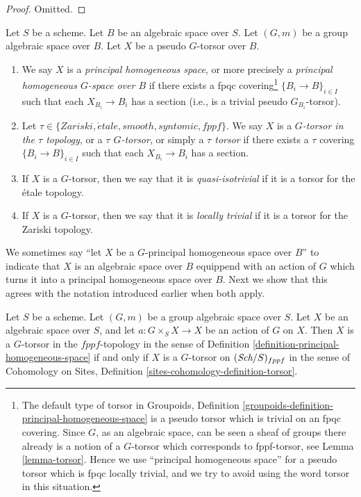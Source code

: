 \begin{proof}
Omitted.
\end{proof}

\begin{definition}
\label{definition-principal-homogeneous-space}
Let $S$ be a scheme.
Let $B$ be an algebraic space over $S$.
Let $(G, m)$ be a group algebraic space over $B$.
Let $X$ be a pseudo $G$-torsor over $B$.
\begin{enumerate}
\item We say $X$ is a
{\it principal homogeneous space}, or more precisely a
{\it principal homogeneous $G$-space over $B$}
if there exists a fpqc covering\footnote{The default type of torsor in
Groupoids, Definition \ref{groupoids-definition-principal-homogeneous-space}
is a pseudo torsor which is trivial on an fpqc covering.
Since $G$, as an algebraic space, can be seen a sheaf of groups
there already is a notion of a $G$-torsor which corresponds
to fppf-torsor, see
Lemma \ref{lemma-torsor}.
Hence we use ``principal homogeneous space'' for a pseudo torsor which
is fpqc locally trivial, and we try to avoid using the word torsor in
this situation.}
$\{B_i \to B\}_{i \in I}$ such that each
$X_{B_i} \to B_i$ has a section (i.e., is a trivial pseudo $G_{B_i}$-torsor).
\item Let $\tau \in \{Zariski, \acute{e}tale, smooth, syntomic, fppf\}$.
We say $X$ is a {\it $G$-torsor in the $\tau$ topology}, or a
{\it $\tau$ $G$-torsor}, or simply a {\it $\tau$ torsor}
if there exists a $\tau$ covering $\{B_i \to B\}_{i \in I}$
such that each $X_{B_i} \to B_i$ has a section.
\item If $X$ is a $G$-torsor, then we say that it is
{\it quasi-isotrivial} if it is a torsor for the \'etale topology.
\item If $X$ is a $G$-torsor, then we say that it is
{\it locally trivial} if it is a torsor for the Zariski topology.
\end{enumerate}
\end{definition}

\noindent
We sometimes say ``let $X$ be a $G$-principal homogeneous space over $B$''
to indicate that $X$ is an algebraic space over $B$ equippend with an
action of $G$ which turns it into a principal homogeneous space over $B$.
Next we show that this agrees with the notation introduced earlier
when both apply.

\begin{lemma}
\label{lemma-torsor}
Let $S$ be a scheme.
Let $(G, m)$ be a group algebraic space over $S$.
Let $X$ be an algebraic space over $S$, and let
$a : G \times_S X \to X$ be an action of $G$ on $X$.
Then
$X$ is a $G$-torsor in the $fppf$-topology in the sense of
Definition \ref{definition-principal-homogeneous-space}
if and only if
$X$ is a $G$-torsor on $(\textit{Sch}/S)_{fppf}$
in the sense of
Cohomology on Sites, Definition \ref{sites-cohomology-definition-torsor}.
\end{lemma}

